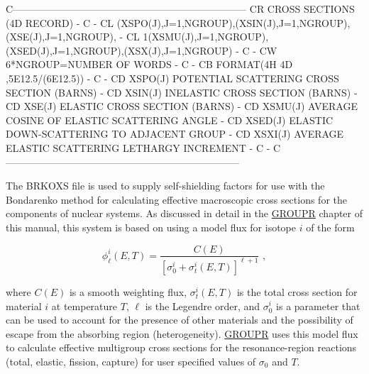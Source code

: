 \begin{ccode}
C-----------------------------------------------------------------------
CR          CROSS SECTIONS   (4D RECORD)                               -
C                                                                      -
CL    (XSPO(J),J=1,NGROUP),(XSIN(J),J=1,NGROUP),(XSE(J),J=1,NGROUP),   -
CL   1(XSMU(J),J=1,NGROUP),(XSED(J),J=1,NGROUP),(XSX(J),J=1,NGROUP)    -
C                                                                      -
CW    6*NGROUP=NUMBER OF WORDS                                         -
C                                                                      -
CB    FORMAT(4H 4D ,5E12.5/(6E12.5))                                   -
C                                                                      -
CD    XSPO(J)       POTENTIAL SCATTERING CROSS SECTION (BARNS)         -
CD    XSIN(J)       INELASTIC CROSS SECTION (BARNS)                    -
CD    XSE(J)        ELASTIC CROSS SECTION (BARNS)                      -
CD    XSMU(J)       AVERAGE COSINE OF ELASTIC SCATTERING ANGLE         -
CD    XSED(J)       ELASTIC DOWN-SCATTERING TO ADJACENT GROUP          -
CD    XSXI(J)       AVERAGE ELASTIC SCATTERING LETHARGY INCREMENT      -
C                                                                      -
C-----------------------------------------------------------------------

\end{ccode}
\normalsize

The BRKOXS file is used to supply self-shielding factors for use
with the Bondarenko method\cite{Bondarenko} for calculating effective
macroscopic cross sections for the components of nuclear systems.
As discussed in detail in the
\hyperlink{sGROUPRhy}{GROUPR} chapter of this manual, this
system is based on using a model flux for isotope $i$ of the form

\begin{equation}
   \phi^i_\ell(E,T)=\frac{C(E)}{[\sigma^i_0+\sigma^i_t(E,T)]^{\ell+1}}\,\,,
\end{equation}

\noindent
where $C(E)$ is a smooth weighting flux, $\sigma^i_t(E,T)$ is the
total cross section for material $i$ at temperature $T$, $\ell$
is the Legendre order, and $\sigma^i_0$ is a parameter that can
be used to account for the presence of other materials and the
possibility of escape from the absorbing region
(heterogeneity).  \hyperlink{sGROUPRhy}{GROUPR} uses
this model flux to calculate effective multigroup
cross sections for the resonance-region reactions (total, elastic,
fission, capture) for user specified values of $\sigma_0$ and $T$.

